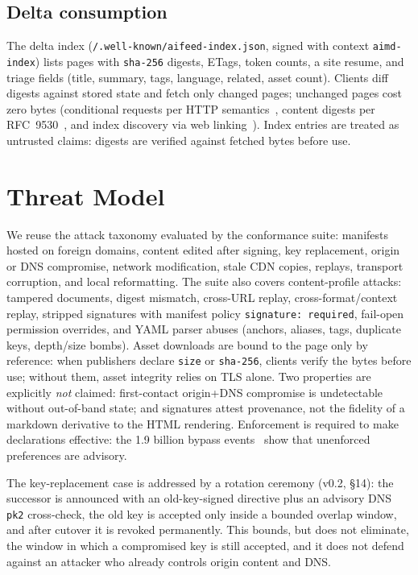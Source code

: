 \documentclass[11pt]{article}
\newcommand{\code}[1]{\texttt{#1}}
\begin{document}
\subsection{Delta consumption}

The delta index (\code{/.well-known/aifeed-index.json}, signed with context
\code{aimd-index}) lists pages with \code{sha-256} digests, ETags, token counts, a site
resume, and triage fields (title, summary, tags, language, related, asset count). Clients diff digests
against stored state and fetch only changed pages; unchanged pages cost zero bytes
(conditional requests per HTTP semantics~\citep{rfc9110,rfc7231}, content digests per
RFC~9530~\citep{rfc9530}, and index discovery via web linking~\citep{rfc8288}). Index
entries are treated as untrusted claims: digests are verified against fetched bytes
before use.

\section{Threat Model}

We reuse the attack taxonomy evaluated by the conformance suite: manifests hosted on
foreign domains, content edited after signing, key replacement, origin or DNS compromise,
network modification, stale CDN copies, replays, transport corruption, and local
reformatting. The suite also covers content-profile attacks: tampered documents, digest
mismatch, cross-URL replay, cross-format/context replay, stripped signatures with
manifest policy \code{signature: required}, fail-open permission overrides, and YAML
parser abuses (anchors, aliases, tags, duplicate keys, depth/size bombs). Asset downloads
are bound to the page only by reference: when publishers declare \code{size} or
\code{sha-256}, clients verify the bytes before use; without them, asset integrity relies
on TLS alone. Two properties
are explicitly \emph{not} claimed: first-contact origin+DNS compromise is undetectable
without out-of-band state; and signatures attest provenance, not the fidelity of a
markdown derivative to the HTML rendering. Enforcement is required to make declarations
effective: the 1.9 billion bypass events~\citep{tollbit} show that unenforced preferences
are advisory.

The key-replacement case is addressed by a rotation ceremony (v0.2, \S14): the successor
is announced with an old-key-signed directive plus an advisory DNS \code{pk2}
cross-check, the old key is accepted only inside a bounded overlap window, and after
cutover it is revoked permanently. This bounds, but does not eliminate, the window in
which a compromised key is still accepted, and it does not defend against an attacker
who already controls origin content and DNS.
\end{document}
